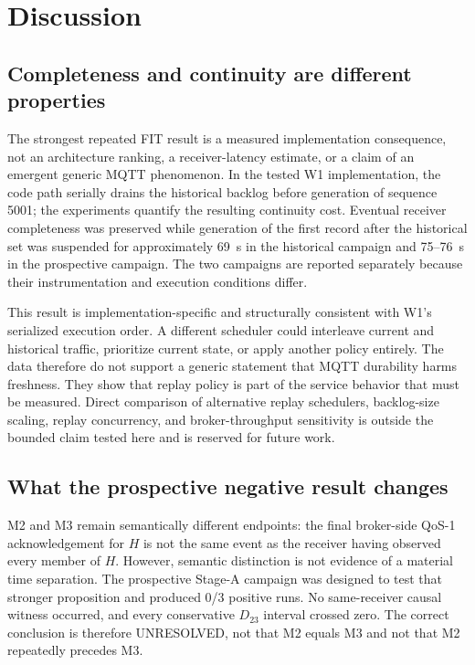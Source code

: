 \documentclass[journal]{IEEEtran}
\begin{document}
\section{Discussion}
\label{sec:discussion}

\subsection{Completeness and continuity are different properties}

The strongest repeated FIT result is a measured implementation consequence, not an architecture ranking, a receiver-latency estimate, or a claim of an emergent generic MQTT phenomenon. In the tested W1 implementation, the code path serially drains the historical backlog before generation of sequence 5001; the experiments quantify the resulting continuity cost. Eventual receiver completeness was preserved while generation of the first record after the historical set was suspended for approximately 69~s in the historical campaign and 75--76~s in the prospective campaign. The two campaigns are reported separately because their instrumentation and execution conditions differ.

This result is implementation-specific and structurally consistent with W1's serialized execution order. A different scheduler could interleave current and historical traffic, prioritize current state, or apply another policy entirely. The data therefore do not support a generic statement that MQTT durability harms freshness. They show that replay policy is part of the service behavior that must be measured. Direct comparison of alternative replay schedulers, backlog-size scaling, replay concurrency, and broker-throughput sensitivity is outside the bounded claim tested here and is reserved for future work.

\subsection{What the prospective negative result changes}

M2 and M3 remain semantically different endpoints: the final broker-side QoS-1 acknowledgement for $H$ is not the same event as the receiver having observed every member of $H$. However, semantic distinction is not evidence of a material time separation. The prospective Stage-A campaign was designed to test that stronger proposition and produced 0/3 positive runs. No same-receiver causal witness occurred, and every conservative $D_{23}$ interval crossed zero. The correct conclusion is therefore UNRESOLVED, not that M2 equals M3 and not that M2 repeatedly precedes M3.
\end{document}

